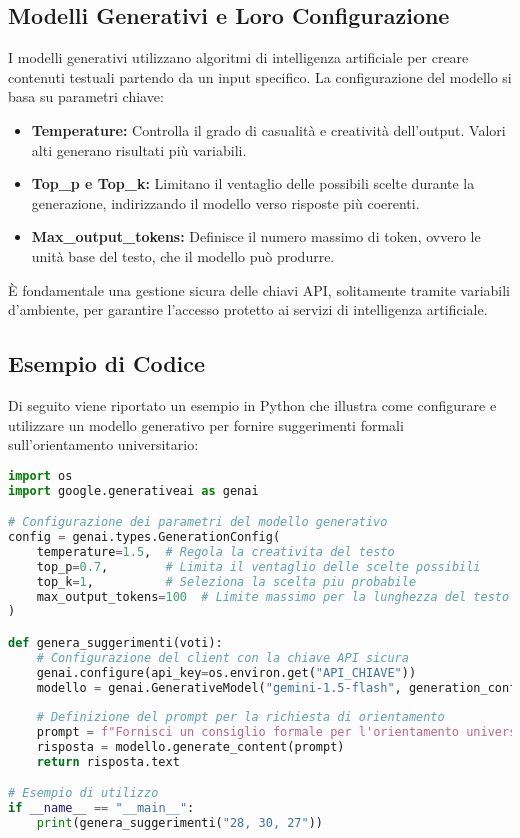 \subsection*{Modelli Generativi e Loro Configurazione}
I modelli generativi utilizzano algoritmi di intelligenza artificiale per creare contenuti testuali partendo da un input specifico. La configurazione del modello si basa su parametri chiave:
\begin{itemize}
    \item \textbf{Temperature:} Controlla il grado di casualità e creatività dell'output. Valori alti generano risultati più variabili.
    \item \textbf{Top\_p e Top\_k:} Limitano il ventaglio delle possibili scelte durante la generazione, indirizzando il modello verso risposte più coerenti.
    \item \textbf{Max\_output\_tokens:} Definisce il numero massimo di token, ovvero le unità base del testo, che il modello può produrre.
\end{itemize}
È fondamentale una gestione sicura delle chiavi API, solitamente tramite variabili d'ambiente, per garantire l’accesso protetto ai servizi di intelligenza artificiale.

\subsection*{Esempio di Codice}
Di seguito viene riportato un esempio in Python che illustra come configurare e utilizzare un modello generativo per fornire suggerimenti formali sull’orientamento universitario:

\begin{lstlisting}[language=Python, caption=Esempio di utilizzo di un modello generativo per l'orientamento universitario, basicstyle=\ttfamily\small, breaklines=true]
import os
import google.generativeai as genai

# Configurazione dei parametri del modello generativo
config = genai.types.GenerationConfig(
    temperature=1.5,  # Regola la creativita del testo
    top_p=0.7,        # Limita il ventaglio delle scelte possibili
    top_k=1,          # Seleziona la scelta piu probabile
    max_output_tokens=100  # Limite massimo per la lunghezza del testo generato
)

def genera_suggerimenti(voti):
    # Configurazione del client con la chiave API sicura
    genai.configure(api_key=os.environ.get("API_CHIAVE"))
    modello = genai.GenerativeModel("gemini-1.5-flash", generation_config=config)
    
    # Definizione del prompt per la richiesta di orientamento
    prompt = f"Fornisci un consiglio formale per l'orientamento universitario. Voti: {voti}"
    risposta = modello.generate_content(prompt)
    return risposta.text

# Esempio di utilizzo
if __name__ == "__main__":
    print(genera_suggerimenti("28, 30, 27"))
\end{lstlisting}